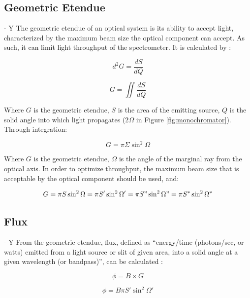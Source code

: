 \subsection{Geometric Etendue} - Y
The geometric etendue of an optical system is its ability to accept light, characterized by the maximum beam size the optical component can accept. As such, it can limit light throughput of the spectrometer. It is calculated by \cite{Horiba_throughput_etendue}:

\begin{equation}
    d^2G = \frac{dS}{dQ}
\end{equation}

\begin{equation}
    G = \iint\frac{dS}{dQ}
\end{equation}

Where $G$ is the geometric etendue, $S$ is the area of the emitting source, $Q$ is the solid angle into which light propagates (2$\Omega$ in Figure \ref{fig:monochromator}).
Through integration:

\begin{equation}
    G = \pi\Sigma\sin^2\Omega
\end{equation}

Where $G$ is the geometric etendue, $\Omega$ is the angle of the marginal ray from the optical axis.
In order to optimize throughput, the maximum beam size that is acceptable by the optical component should be used, and:

\begin{equation}
    G = \pi S\sin^2\Omega = \pi S'\sin^2\Omega' = \pi S"\sin^2\Omega" = \pi S^*\sin^2\Omega^*
\end{equation}

\subsection{Flux} - Y
From the geometric etendue, flux, defined as “energy/time (photons/sec, or watts) emitted from a light source or slit of given area, into a solid angle at a given wavelength (or bandpass)”, can be calculated \cite{Horiba_throughput_etendue}:

\begin{equation}
    \phi = B\times G
\end{equation}

\begin{equation}
    \phi = B\pi S'\sin^2\Omega'
\end{equation}

